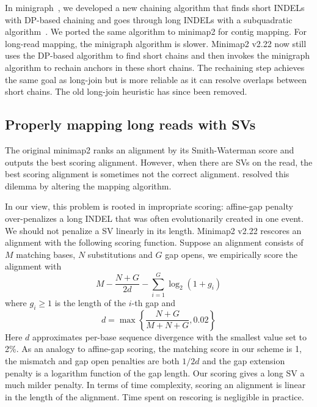\documentclass{bioinfo}
\begin{document}
\begin{methods}
In minigraph~\citep{Li:2020aa}, we developed a new chaining algorithm that
finds short INDELs with DP-based chaining and goes through long INDELs with a
subquadratic algorithm~\citep{DBLP:conf/wabi/AbouelhodaO03}. We ported the same
algorithm to minimap2 for contig mapping. For long-read mapping, the minigraph
algorithm is slower. Minimap2 v2.22 now still uses the DP-based algorithm to
find short chains and then invokes the minigraph algorithm to rechain anchors in
these short chains. The rechaining step achieves the same goal as long-join
but is more reliable as it can resolve overlaps between short chains. The old
long-join heuristic has since been removed.

\subsection{Properly mapping long reads with SVs}
The original minimap2 ranks an alignment by its Smith-Waterman score and
outputs the best scoring alignment. However, when there are SVs on the read,
the best scoring alignment is sometimes not the correct alignment.
\citet{Jain2020.11.01.363887} resolved this dilemma by altering the mapping
algorithm.

In our view, this problem is rooted in impropriate scoring: affine-gap penalty
over-penalizes a long INDEL that was often evolutionarily created in one event.
We should not penalize a SV linearly in its length. Minimap2 v2.22 rescores
an alignment with the following scoring function. Suppose an alignment consists
of $M$ matching bases, $N$ substitutions and $G$ gap opens, we empirically
score the alignment with
$$
M-\frac{N+G}{2d}-\sum_{i=1}^G\log_2(1+g_i)
$$
where $g_i\ge1$ is the length of the $i$-th gap and
$$
d=\max\left\{\frac{N+G}{M+N+G},0.02\right\}
$$
Here $d$ approximates per-base sequence divergence with the smallest value set
to 2\%. As an analogy to affine-gap scoring, the matching score in our scheme
is 1, the mismatch and gap open penalties are both $1/2d$ and the gap extension
penalty is a logarithm function of the gap length. Our scoring gives a long SV
a much milder penalty. In terms of time complexity, scoring an alignment is
linear in the length of the alignment. Time spent on rescoring is negligible in
practice.


\end{methods}
\end{document}
